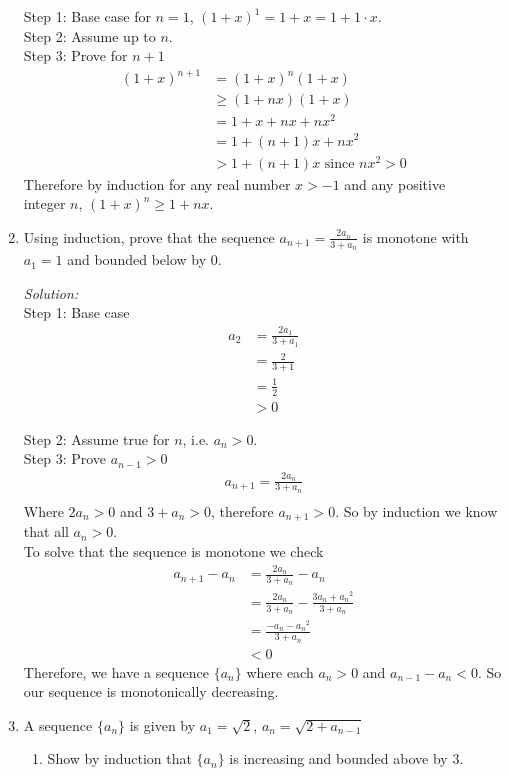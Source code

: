 \documentclass[12pt]{article}
\theoremstyle{remark}
\begin{document}
\begin{enumerate}
\begin{mdframed}[style=TheoremFrame]
Step 1: Base case for $n=1$, $(1+x)^1 = 1+x = 1 + 1\cdot x$.\\

Step 2: Assume up to $n$.\\

Step 3: Prove for $n+1$\\

\begin{align*}
(1+x)^{n+1} &= (1+x)^n(1+x)\\
&\geq (1+nx)(1+x)\\
&= 1 + x + nx + nx^2\\
&= 1 + (n+1)x + nx^2\\
&>  1 + (n+1)x \text{ since } nx^2>0
\end{align*}
Therefore by induction for any real number $x>-1$ and any positive\\ integer $n$, $(1+x)^n \geq 1 + nx$.
\end{mdframed}
\newpage
\item  Using induction, prove that the sequence  $\displaystyle{a_{n+1} = \frac{2a_n}{3+a_n}}$ is monotone with\\ $a_1 = 1$ and bounded below by $0$.
\begin{mdframed}[style=TheoremFrame]
\textit{Solution:}\\

Step 1: Base case
\begin{align*}
a_2 &= \frac{2a_1}{3+a_1}\\
&= \frac{2}{3+1}\\
&= \frac{1}{2}\\
&> 0 
\end{align*}

Step 2: Assume true for $n$, i.e. $a_n >0$.\\

Step 3: Prove $a_{n-1} > 0$
\begin{align*}
a_{n+1} = \frac{2a_n}{3+a_n}\\
\end{align*}
Where $2a_n > 0$ and $3+a_n>0$, therefore $a_{n+1}>0$. So by induction we know that all $a_n >0$.\\

To solve that the sequence is monotone we check
\begin{align*}
a_{n+1} - a_n &= \frac{2a_n}{3+a_n} - a_n\\
&= \frac{2a_n}{3+a_n}-\frac{3a_n + {a_n}^2}{3+a_n}\\
&= \frac{-a_n-{a_n}^2}{3+a_n}\\
&<0
\end{align*}
Therefore, we have a sequence $\{a_n\}$ where each $a_n >0$ and $a_{n-1} - a_n < 0$. So our sequence is monotonically decreasing.
\end{mdframed}
\newpage
\item A sequence $\{ a_n \}$ is given by $a_1 = \sqrt{2}$, $\displaystyle{a_n = \sqrt{2+a_{n-1}}}$
\begin{enumerate}
\item Show by induction that $\{ a_n \}$ is increasing and bounded above by $3$.


\end{enumerate}
\end{enumerate}
\end{document}
